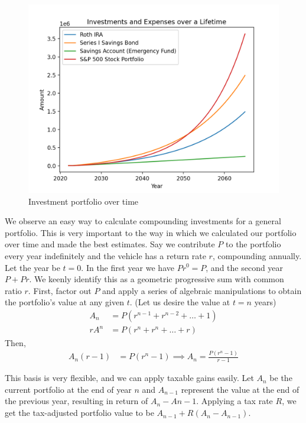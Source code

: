 \documentclass[12pt]{article}
\begin{document}
\begin{figure}[H]
    \centering
    \includegraphics[scale=0.75]{wealth.png}
    \caption{Investment portfolio over time}
\end{figure}

We observe an easy way to calculate compounding investments for a general portfolio. This is very important to the way in which we calculated our portfolio over time and made the best estimates.
Say we contribute $P$ to the portfolio every year indefinitely and the vehicle has a return rate $r$, compounding annually. Let the year be $t=0$.
In the first year we have $Pr^0=P$, and the second year $P+Pr$. We keenly identify this as a geometric progressive sum with common ratio $r$.
First, factor out $P$ and apply a series of algebraic manipulations to obtain the portfolio's value at any given $t$. (Let us desire the value at $t=n$ years)
\begin{align*}
    A_n &= P\left(r^{n-1} + r^{n-2} + \ldots + 1\right)\\
    rA^n&=P\left(r^{n} + r^{n} + \ldots + r\right)
\end{align*}
Then,
\begin{align*}
    A_n(r-1)&=P\left(r^{n}-1\right)\implies A_n=\frac{P\left(r^{n}-1\right)}{r-1}
\end{align*}

This basis is very flexible, and we can apply taxable gains easily. Let $A_n$ be the current portfolio at the end of year $n$
and $A_{n-1}$ represent the value at the end of the previous year, resulting in return of $A_n-A{n-1}$. Applying a tax rate $R$,
we get the tax-adjusted portfolio value to be $A_{n-1} + R(A_n-A_{n-1})$.
\end{document}
